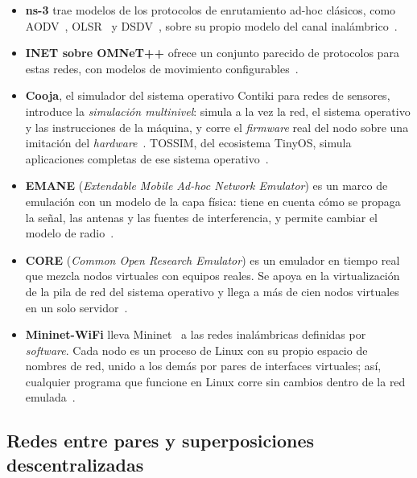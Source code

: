 \begin{itemize}
\item \textbf{ns-3} trae modelos de los protocolos de enrutamiento ad-hoc
clásicos, como AODV~\cite{Perkins2003AODV}, OLSR~\cite{Clausen2003OLSR} y
DSDV~\cite{Perkins1994DSDV}, sobre su propio modelo del canal
inalámbrico~\cite{Ns3Modelos}.

\item \textbf{INET sobre OMNeT++} ofrece un conjunto parecido de protocolos para
estas redes, con modelos de movimiento configurables~\cite{Varga2008Omnetpp,InetFramework}.

\item \textbf{Cooja}, el simulador del sistema operativo Contiki para redes de
sensores, introduce la \textit{simulación multinivel}: simula a la vez la red, el
sistema operativo y las instrucciones de la máquina, y corre el \textit{firmware}
real del nodo sobre una imitación del \textit{hardware}~\cite{Osterlind2006Cooja}.
TOSSIM, del ecosistema TinyOS, simula aplicaciones completas de ese sistema
operativo~\cite{Levis2003Tossim}.

\item \textbf{EMANE} (\textit{Extendable Mobile Ad-hoc Network Emulator}) es un
marco de emulación con un modelo de la capa física: tiene en cuenta cómo se
propaga la señal, las antenas y las fuentes de interferencia, y permite cambiar el
modelo de radio~\cite{Emane}.

\item \textbf{CORE} (\textit{Common Open Research Emulator}) es un emulador en
tiempo real que mezcla nodos virtuales con equipos reales. Se apoya en la
virtualización de la pila de red del sistema operativo y llega a más de cien nodos
virtuales en un solo servidor~\cite{Ahrenholz2008Core}.

\item \textbf{Mininet-WiFi} lleva Mininet~\cite{Lantz2010Mininet} a las redes
inalámbricas definidas por \textit{software}. Cada nodo es un proceso de Linux con
su propio espacio de nombres de red, unido a los demás por pares de interfaces
virtuales; así, cualquier programa que funcione en Linux corre sin cambios dentro
de la red emulada~\cite{Fontes2015MininetWifi}.
\end{itemize}

\subsection{Redes entre pares y superposiciones descentralizadas}
\label{subsec:p2p}

